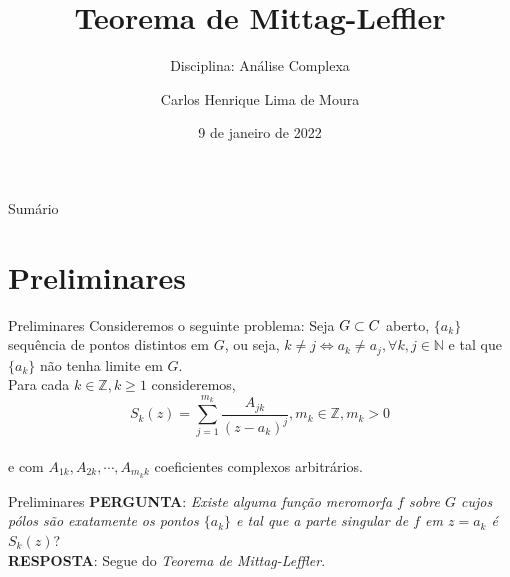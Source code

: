 \documentclass{libs/ufc_format}
\title[Teorema de Mittag-Leffler]{\huge\textbf{Teorema de Mittag-Leffler}}
\subtitle{Disciplina:    Análise Complexa}
\author{Carlos Henrique Lima de Moura}
\institute[UFC]{
    \department{Mestrado em Matemática}
    \newline
    \ufc
}
\date{9 de janeiro de 2022}
\begin{document}

\newtheorem{defi}{\uline{Definição}}
\newtheorem{teo}{\uline{Teorema}}
\newtheorem{prop}{\uline{Proposição}}
\newtheorem{lem}{\uline{Lema}}
\newtheorem{exemplo}{Exemplo}
\newtheorem{prova}{\uline {Prova}:}
\begin{frame}{}
    \maketitle
\end{frame}

\begin{frame}{Sumário}
    \tableofcontents
\end{frame}

\section{Preliminares}
\begin{frame}{Preliminares}
Consideremos o seguinte problema: Seja $G\subset \mathbb\mathbb{C}$ aberto, \pause  $\{a_{k}\}$ sequência de pontos distintos em $G$, ou seja, $k\neq j \Longleftrightarrow a_{k}\neq a_{j}, \forall k,j \in \mathbb{N}$ e \pause tal que $\{a_{k}\}$ não tenha limite em $G$. \\
\pause
Para cada $k\in \mathbb{Z}, k\geq 1$ consideremos, \pause 
$$S_{k}\left(z\right)= \displaystyle \sum_{j=1}^{m_{k}}\frac{A_{jk}}{\left(z-a_{k}\right)^{j}}, m_{k}\in \mathbb{Z}, m_{k}>0$$\\
\pause e com $A_{1k}, A_{2k}, \cdots, A_{m_{k}k}$ coeficientes complexos arbitrários.\\
\end{frame}

\begin{frame}{Preliminares}
\textbf{PERGUNTA}: \textit{Existe alguma função meromorfa $f$ sobre $G$ cujos pólos são exatamente os pontos $\{a_{k}\}$ e tal que a parte singular de $f$ em $z=a_{k}$ é $S_{k}\left(z\right)$}? \\
\textbf{RESPOSTA}: Segue do \textit{Teorema de Mittag-Leffler}.
\end{frame}
\end{document}
